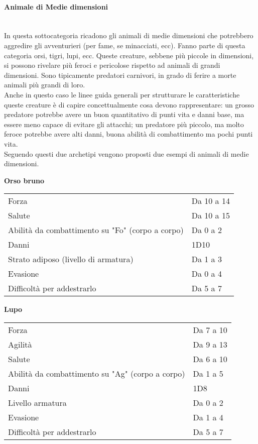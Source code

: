 \documentclass[../manuale_main.tex]{subfiles}
\begin{document}
\paragraph{Animale di Medie dimensioni}\mbox{}\\ 
In questa sottocategoria ricadono gli animali di medie dimensioni che potrebbero aggredire gli avventurieri (per fame, se minacciati, ecc). Fanno parte di questa categoria orsi, tigri, lupi, ecc. Queste creature, sebbene più piccole in dimensioni, si possono rivelare più feroci e pericolose rispetto ad animali di grandi dimensioni. Sono tipicamente predatori carnivori, in grado di ferire a morte animali più grandi di loro.\\
Anche in questo caso le linee guida generali per strutturare le caratteristiche queste creature è di capire concettualmente cosa devono rappresentare: un grosso predatore potrebbe avere un buon quantitativo di punti vita e danni base, ma essere meno capace di evitare gli attacchi; un predatore più piccolo, ma molto feroce potrebbe avere alti danni, buona abilità di combattimento ma pochi punti vita.\\
Seguendo questi due archetipi vengono proposti due esempi di animali di medie dimensioni.\\

\begin{center}
\textbf{Orso bruno}\\
\renewcommand{\arraystretch}{1.2}
\begin{tabularx}{\linewidth}{Q F}
Forza&Da 10 a 14\\
Salute&Da 10 a 15\\
Abilità da combattimento su "Fo" (corpo a corpo)&Da 0 a 2\\
Danni&1D10\\
Strato adiposo (livello di armatura)&Da 1 a 3\\
Evasione&Da 0 a 4\\
Difficoltà per addestrarlo&Da 5 a 7\\
\end{tabularx}


\textbf{Lupo}\\
\renewcommand{\arraystretch}{1.2}
\begin{tabularx}{\linewidth}{Q F}
Forza&Da 7 a 10\\
Agilità&Da 9 a 13\\
Salute&Da 6 a 10\\
Abilità da combattimento su "Ag" (corpo a corpo)&Da 1 a 5\\
Danni&1D8\\
Livello armatura&Da 0 a 2\\
Evasione&Da 1 a 4\\
Difficoltà per addestrarlo&Da 5 a 7\\
\end{tabularx}

\end{center}
\end{document}
